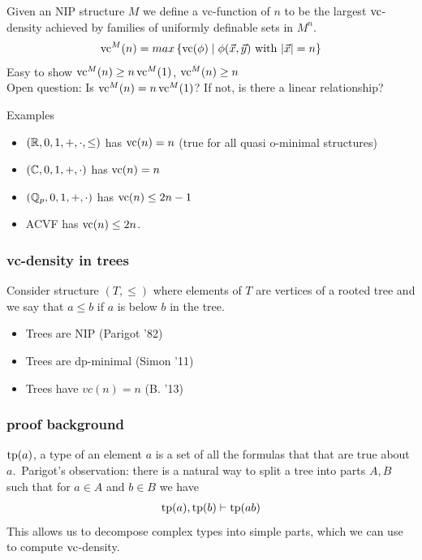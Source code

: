 \documentclass{beamer}
\newcommand{\curly}[1]{\left\{ #1 \right\}}
\begin{document}
\begin{frame}
	Given an NIP structure $M$ we define a vc-function of $n$ to be the largest $\operatorname{vc}$-density achieved by families of uniformly definable sets in $M^n$.
	\begin{align*}
		\vc^M(n) = max \curly{ \vc(\phi) \mid \phi(\vec x, \vec y) \text{ with } |\vec x| = n}
	\end{align*}
	Easy to show $\operatorname{vc}^M(n) \geq n \operatorname{vc}^M(1)$, $\operatorname{vc}^M(n) \geq n$ \\
	Open question: Is $\operatorname{vc}^M(n) = n \operatorname{vc}^M(1)$? If not, is there a linear relationship?
\end{frame}

\begin{frame}
	Examples
	\begin{itemize}
		\item $(\mathbb{R}, 0, 1, +, \cdot, \leq)$ has $\operatorname{vc}(n) = n$ (true for all quasi o-minimal structures)
		\item $(\mathbb{C}, 0, 1, +, \cdot)$ has $\operatorname{vc}(n) = n$
		\item $(\mathbb{Q}_p, 0, 1, +, \cdot)$ has $\operatorname{vc}(n) \leq 2n - 1$
		\item ACVF has $\operatorname{vc}(n) \leq 2n$.
	\end{itemize}
\end{frame}

\begin{frame}
	\frametitle{vc-density in trees}
	Consider structure $(T, \leq)$ where elements of $T$ are vertices of a rooted tree and we say that $a \leq b$ if $a$ is below $b$ in the tree.
	\begin{itemize}
		\item Trees are NIP (Parigot '82)
		\item Trees are dp-minimal (Simon '11)
		\item Trees have $vc(n) = n$ (B. '13)
	\end{itemize}
\end{frame}

\begin{frame}
	\frametitle{proof background}
	$\operatorname{tp}(a)$, a type of an element $a$ is a set of all the formulas that that are true about $a$.\
	Parigot's observation: there is a natural way to split a tree into parts $A, B$ such that for $a \in A$ and $b \in B$ we have
	\begin{align*}
		\operatorname{tp}(a), \operatorname{tp}(b) \vdash \operatorname{tp}(ab)
	\end{align*}
	This allows us to decompose complex types into simple parts, which we can use to compute $\operatorname{vc}$-density.
\end{frame}
\end{document}
